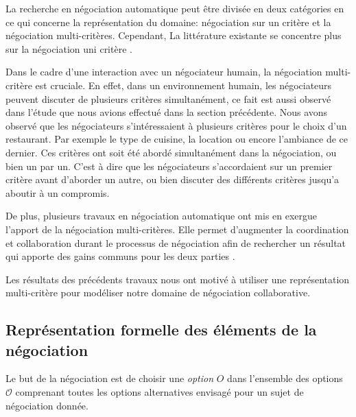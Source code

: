 	
		La recherche en négociation automatique peut être divisée en deux catégories en ce qui concerne la représentation du domaine: négociation sur un critère et la négociation multi-critères. Cependant, La littérature existante se concentre plus sur la négociation uni critère \cite{lai2008decentralized,lai2004literature}. 
		
		Dans le cadre d'une interaction avec un négociateur humain, la négociation multi-critère est cruciale. En effet, dans un environnement humain, les négociateurs peuvent discuter de plusieurs critères simultanément, ce fait est aussi observé dans l'étude que nous avions effectué dans la section précédente.  Nous avons observé que les négociateurs s'intéressaient à plusieurs critères pour le choix d'un restaurant. Par exemple le type de cuisine, la location ou encore l'ambiance de ce dernier. Ces critères ont soit été abordé simultanément dans la négociation, ou bien un par un. C'est à dire que les négociateurs s'accordaient sur un premier critère avant d'aborder un autre, ou bien discuter des différents critères jusqu'a aboutir à un compromis.
		
		De plus, plusieurs travaux en négociation automatique ont mis en exergue l'apport de la négociation multi-critères. Elle permet d'augmenter la coordination et collaboration durant le processus de négociation afin de rechercher un résultat qui apporte des gains communs pour les deux parties \cite{jonker2007agent,lai2008decentralized,lai2004literature} . 
	
	
		Les résultats des précédents travaux nous ont motivé à utiliser une représentation multi-critère pour modéliser notre domaine de négociation collaborative. 
		
		\subsection{Représentation formelle des éléments de la négociation }	
		Le but de la négociation est de choisir une \textit{option} $O$ dans l'ensemble des options $\mathcal{O}$ comprenant toutes les options alternatives envisagé pour un sujet de négociation donnée. 
		
